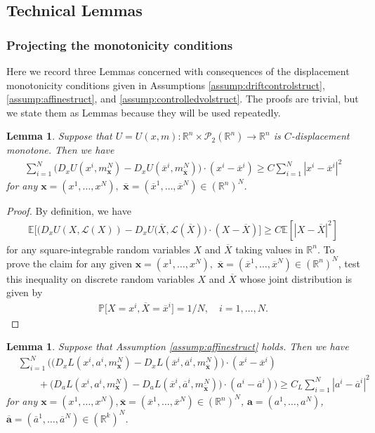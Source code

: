 \documentclass[11pt,reqno]{amsart}
\numberwithin{equation}{section}
\newtheorem{lemma}[theorem]{Lemma}
\theoremstyle{definition}
\def\E{{\mathbb E}}
\def\R{{\mathbb R}}
\newcommand{\bx}{\mathbf{x}}
\newcommand{\sL}{\mathcal{L}}
\newcommand{\bP}{\mathbb{P}}
\newcommand{\spt}{\mathcal{P}_2(\R^n)}
\newcommand{\ov}{\overline}
\def \E{\mathbb{E}}
\def \R{\mathbb{R}}
\begin{document}
\subsection{Technical Lemmas} 
\label{subsec:technical}

\subsubsection{Projecting the monotonicity conditions}

Here we record three Lemmas concerned with consequences of the displacement monotonicity conditions given in Assumptions \ref{assump:driftcontrolstruct}, \ref{assump:affinestruct}, and \ref{assump:controlledvolstruct}. The proofs are trivial, but we state them as Lemmas because they will be used repeatedly.

\begin{lemma} \label{lem:dispmonotoneprojected}
Suppose that $U = U(x,m) : \R^n \times \spt \to \R^n$ is $C$-displacement monotone. Then we have 
\begin{align*}
\sum_{i = 1}^N \Big(D_x U(x^i,m_{\bx}^N) - D_xU(\ov{x}^i,m_{\ov{\bx}}^N) \Big) \cdot (x^i - \ov{x}^i ) \geq C \sum_{i = 1}^N |x^i - \ov{x}^i|^2
\end{align*}
for any $\bx = (x^1,\dots,x^N),\,\, \ov{\bx} = (\ov{x}^1,\dots,\ov{x}^N) \in (\R^n)^N$.
\end{lemma}

\begin{proof}
    By definition, we have 
    \begin{align*}
    \E\Big[\big(D_x U(X , \sL(X)) - D_xU(\ov{X}, \sL(\ov{X})\big) \cdot (X - \ov{X}) \Big] \geq C \E[|X - \ov{X}|^2]
    \end{align*}
    for any square-integrable random variables $X$ and $\ov{X}$ taking values in $\R^n$. 
    To prove the claim for any given $\bx = (x^1,\dots,x^N),\,\, \ov{\bx} = (\ov{x}^1,\dots,\ov{x}^N) \in (\R^n)^N$, test this inequality on discrete random variables $X$ and $\ov{X}$ whose joint distribution is given by 
    \begin{align*}
    \bP\big[ X = x^i, \ov{X} = \ov{x}^i \big] = 1/N, \quad i = 1,\dots,N.
    \end{align*}
\end{proof}

\begin{lemma} \label{lem:dispmonotoneprojectedaffine}
Suppose that Assumption \ref{assump:affinestruct} holds. Then we have 
\begin{align*}
    &\sum_{i = 1}^N \bigg( \Big(D_xL(x^i, a^i, m_{\bx}^N) - D_xL(\ov{x}^i, \ov{a}^i, m_{\ov{\bx}}^N) \Big) \cdot (x^i - \ov{x}^i) \\ 
    &\qquad + \Big(D_aL(x^i, a^i, m_{\bx}^N) - D_aL(\ov{x}^i, \ov{a}^i, m_{\ov{\bx}}^N) \Big) \cdot (a^i - \ov{a}^i) \bigg) \geq C_L \sum_{i = 1}^N |a^i - \ov{a}^i|^2 
\end{align*}
for any $\bx = (x^1,\dots,x^N),  \ov{\bx} = (\ov{x}^1,\dots,\ov{x}^N) \in (\R^n)^N$, $\bm a = (a^1,\dots,a^N)$, $\bm{\ov{a}} = (\ov{a}^1,\dots,\ov{a}^N) \in (\R^k)^N$. 
\end{lemma}
\end{document}
